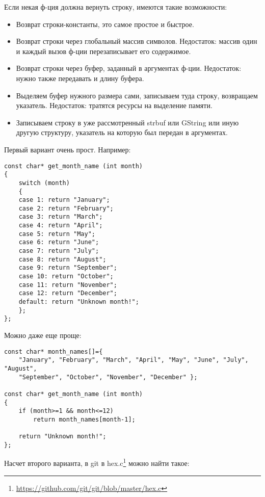 Если некая ф-ция должна вернуть строку, имеются такие возможности:

\begin{itemize}
\item
Возврат строки-константы, это самое простое и быстрое.

\item
Возврат строки через глобальный массив символов. Недостаток: массив один и каждый вызов ф-ции перезаписывает
его содержимое.

\item
Возврат строки через буфер, заданный в аргументах ф-ции. Недостаток: нужно также передавать и длину буфера.

\item
Выделяем буфер нужного размера сами, записываем туда строку, возвращаем указатель. Недостаток: тратятся ресурсы
на выделение памяти.

\item
Записываем строку в уже рассмотренный strbuf или GString или иную другую структуру, указатель на которую был
передан в аргументах.

\end{itemize}

Первый вариант очень прост. Например:

\begin{lstlisting}
const char* get_month_name (int month)
{
	switch (month)
	{
	case 1: return "January";
	case 2: return "February";
	case 3: return "March";
	case 4: return "April";
	case 5: return "May";
	case 6: return "June";
	case 7: return "July";
	case 8: return "August";
	case 9: return "September";
	case 10: return "October";
	case 11: return "November";
	case 12: return "December";
	default: return "Unknown month!";
	};
};
\end{lstlisting}

Можно даже еще проще:

\begin{lstlisting}
const char* month_names[]={
	"January", "February", "March", "April", "May", "June", "July", "August",
	"September", "October", "November", "December" };

const char* get_month_name (int month)
{
	if (month>=1 && month<=12)
		return month_names[month-1];

	return "Unknown month!";
};
\end{lstlisting}

Насчет второго варианта, в git в hex.c\footnote{\url{https://github.com/git/git/blob/master/hex.c}} можно найти такое:

